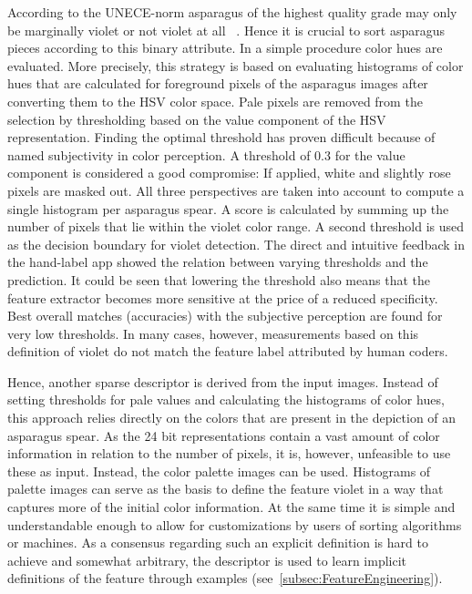 \bigskip
According to the UNECE-norm asparagus of the highest quality grade may only be marginally violet or not violet at all ~\citep{unspargelnorm}. Hence it is crucial to sort asparagus pieces according to this binary attribute. In a simple procedure color hues are evaluated. More precisely, this strategy is based on evaluating histograms of color hues that are calculated for foreground pixels of the asparagus images after converting them to the HSV color space. Pale pixels are removed from the selection by thresholding based on the value component of the HSV representation. Finding the optimal threshold has proven difficult because of named subjectivity in color perception. A threshold of 0.3 for the value component is considered a good compromise: If applied, white and slightly rose pixels are masked out. All three perspectives are taken into account to compute a single histogram per asparagus spear. A score is calculated by summing up the number of pixels that lie within the violet color range. A second threshold is used as the decision boundary for violet detection. The direct and intuitive feedback in the hand-label app showed the relation between varying thresholds and the prediction. It could be seen that lowering the threshold also means that the feature extractor becomes more sensitive at the price of a reduced specificity. Best overall matches (accuracies) with the subjective perception are found for very low thresholds. In many cases, however, measurements based on this definition of violet do not match the feature label attributed by human coders.

Hence, another sparse descriptor is derived from the input images. Instead of setting thresholds for pale values and calculating the histograms of color hues, this approach relies directly on the colors that are present in the depiction of an asparagus spear. As the 24 bit representations contain a vast amount of color information in relation to the number of pixels, it is, however, unfeasible to use these as input. Instead, the color palette images can be used. Histograms of palette images can serve as the basis to define the feature violet in a way that captures more of the initial color information. At the same time it is simple and understandable enough to allow for customizations by users of sorting algorithms or machines. As a consensus regarding such an explicit definition is hard to achieve and somewhat arbitrary, the descriptor is used to learn implicit definitions of the feature through examples (see~\autoref{subsec:FeatureEngineering}).

